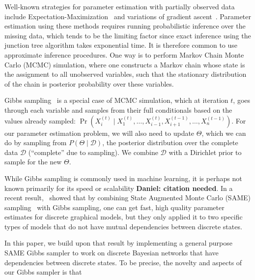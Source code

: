 \documentclass{article} %
\begin{document}
Well-known strategies for parameter estimation with partially observed data include
Expectation-Maximization~\citep{EMpaper} and variations of gradient ascent~\citep{Thiesson95}.
Parameter estimation using these methods requires running probabilistic inference over the missing
data, which tends to be the limiting factor since  exact inference using the junction tree algorithm
takes exponential time. It is therefore common to use approximate inference procedures.  One way is
to perform Markov Chain Monte Carlo (MCMC) simulation, where one constructs a Markov chain whose
state is the assignment to all unobserved variables, such that the stationary distribution of the
chain is posterior probability over these variables.

Gibbs sampling~\citep{Geman1984} is a special case of MCMC simulation, which at iteration $t$, goes
through each variable and samples from their full conditionals based on the values already sampled:
$\Pr(X_i^{(t)} \mid X_1^{(t)}, \ldots, X_{i-1}^{(t)}, X_{i+1}^{(t-1)}, \ldots, X_n^{(t-1)})$. For
our parameter estimation problem, we will also need to update $\Theta$, which we can do by sampling
from $P(\Theta \mid \mathcal{D})$, the posterior distribution over the complete data $\mathcal{D}$
(``complete'' due to sampling). We combine $\mathcal{D}$ with a Dirichlet prior to sample for the
new $\Theta$.

While Gibbs sampling is commonly used in machine learning, it is perhaps not known primarily for its
speed or scalability \textbf{Daniel: citation needed}. In a recent result,~\citet{SAME2015} showed
that by combining State Augmented Monte Carlo (SAME) sampling~\citep{SAME2002} with Gibbs sampling,
one can get fast, high quality parameter estimates for discrete graphical models, but they only
applied it to two specific types of models that do not have mutual dependencies between discrete
states.

In this paper, we build upon that result by implementing a general purpose SAME Gibbs sampler to
work on discrete Bayesian networks that have dependencies between discrete states. To be precise,
the novelty and aspects of our Gibbs sampler is that
\end{document}
